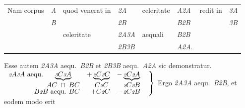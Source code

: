 \begin{tabular}{llllllll}
Nam corpus &\hspace*{-3mm}\textit{A}& quod venerat in&\hspace*{-3mm}\textit{{\scriptsize2}A} &
celeritate &\hspace*{-3mm}\textit{A{\scriptsize2}A} &
redit in &\hspace*{-3mm}\textit{{\scriptsize3}A} \\
\dotfill&\hspace*{-3mm}\textit{B}&\dotfill &\hspace*{-2mm}\textit{{\scriptsize2}B}&\dotfill &\dotfill \hspace*{-3mm}\textit{B{\scriptsize2}B}&\dotfill &\dotfill \hspace*{-3mm}\textit{{\scriptsize3}B}
\\
&&celeritate &\hspace*{-3mm}\textit{{\scriptsize2}A{\scriptsize3}A} & aequali &\hspace*{-3mm}\textit{B{\scriptsize2}B}&&\\
&&\dotfill &\dotfill \hspace*{-3mm}\textit{{\scriptsize2}B{\scriptsize3}B}&\dotfill &\dotfill \hspace*{-3mm}\textit{A{\scriptsize2}A}.&&
\end{tabular}
\pend \pstart\noindent
Esse autem \textit{{\scriptsize2}A{\scriptsize3}A} aequ.\ \textit{B{\scriptsize2}B} et \textit{{\scriptsize2}B{\scriptsize3}B} aequ.\ \textit{A{\scriptsize2}A} sic demonstratur.\pend
%
 \pstart\noindent
$\left. \begin{array}{rrr} {\scriptstyle \textit{2}}A{\scriptstyle \textit{3}}A \ \textup{aequ.}\ \underbrace{{\scriptstyle \textit{3}}C{\scriptstyle \textit{3}}A}_{\displaystyle AC\; \sqcap\; BC} & + \underbrace{ {\scriptstyle \textit{2}}C{\scriptstyle \textit{3}}C}_{\displaystyle C{\scriptstyle \textit{2}}C} & - \underbrace{ {\scriptstyle \textit{2}}C{\scriptstyle \textit{2}}A}_{\displaystyle {\scriptstyle \textit{2}}C{\scriptstyle \textit{2}}B} \\
B{\scriptstyle \textit{2}}B \ \textup{aequ.}\ BC  &+ C{\scriptstyle \textit{2}}C & - {\scriptstyle \textit{2}}C{\scriptstyle \textit{2}}B \end{array} \ \ \right\}$ Ergo \textit{{\scriptsize2}A{\scriptsize3}A} aequ.\ \textit{B{\scriptsize2}B}, et eodem modo
erit 
%
